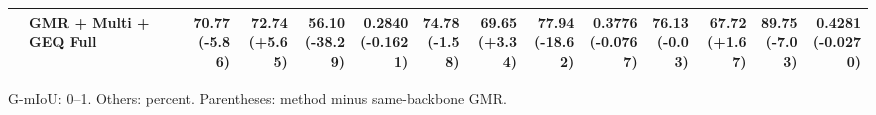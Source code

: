 \documentclass{article}
\begin{document}
{\begin{tabular}{llrrrrrrrrrrrr}
 & GMR + Multi + GEQ Full & \shortstack{70.77 \\ {\scriptsize\textcolor{Loss}{(-5.86)}}} & \shortstack{72.74 \\ {\scriptsize\textcolor{Gain}{(+5.65)}}} & \shortstack{56.10 \\ {\scriptsize\textcolor{Loss}{(-38.29)}}} & \shortstack{0.2840 \\ {\scriptsize\textcolor{Loss}{(-0.1621)}}} & \shortstack{74.78 \\ {\scriptsize\textcolor{Loss}{(-1.58)}}} & \shortstack{69.65 \\ {\scriptsize\textcolor{Gain}{(+3.34)}}} & \shortstack{77.94 \\ {\scriptsize\textcolor{Loss}{(-18.62)}}} & \shortstack{0.3776 \\ {\scriptsize\textcolor{Loss}{(-0.0767)}}} & \shortstack{76.13 \\ {\scriptsize\textcolor{Loss}{(-0.03)}}} & \shortstack{67.72 \\ {\scriptsize\textcolor{Gain}{(+1.67)}}} & \shortstack{89.75 \\ {\scriptsize\textcolor{Loss}{(-7.03)}}} & \shortstack{0.4281 \\ {\scriptsize\textcolor{Loss}{(-0.0270)}}} \\
\bottomrule\end{tabular}}\par
G-mIoU: 0--1. Others: percent. Parentheses: method minus same-backbone GMR.\par
\end{document}
